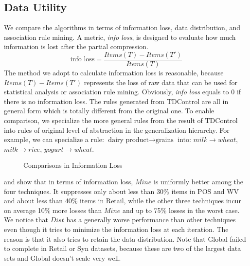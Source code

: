 \subsection{Data Utility}\label{sec:eval:datautility}
We compare the algorithms in terms of information loss, data distribution,
and association rule mining. A metric, {\em info loss}, is designed to evaluate 
how much information is lost after the partial compression.
\[\text{info loss} = \frac{{Items(T) - Items(T')}}{{Items(T)}}\]
The method we adopt to calculate information loss is reasonable,
because ${Items(T) - Items(T')}$ represents the loss of raw data that
can be used for statistical analysis or association rule mining.
Obviously, {\em info loss} equals to 0 if there is no information loss.
The rules generated from TDControl are all in general 
form which is totally different from the original one. 
To enable comparison, we specialize the more general rules from 
the result of TDControl into rules of original level of abstraction 
in the generalization hierarchy. 
For example, we can specialize a rule: $\text{dairy product} \rightarrow  \text{grains}$ into: $milk \rightarrow wheat$, $milk \rightarrow rice$, $yogurt \rightarrow wheat$.


\begin{figure}[th]
\centering
{}
\caption{Comparisons in Information Loss}\label{fig:loss}
\end{figure}


 and  show that in terms 
of information loss, $Mine$ is uniformly better among the four techniques.
It suppresses only about less than 30\% items in POS and WV and about 
less than 40\% items in Retail, while the other three techniques 
incur on average 10\% more losses than $Mine$ and up to 75\% 
losses in the worst case. We notice that $Dist$ has a generally 
worse performance than other techniques even though it tries to 
minimize the information loss at each iteration. 
The reason is that it also tries to retain the data distribution.
Note that Global failed to complete in Retail or Syn datasets,
because these are two of the largest data sets and Global 
doesn't scale very well. 

